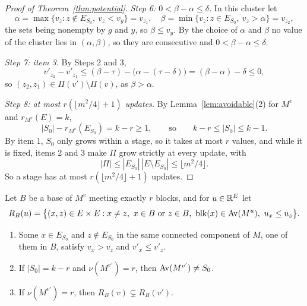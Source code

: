 \begin{proof}[Proof of Theorem~\ref{thm:potential}]
\emph{Step 6: $0<\beta-\alpha\le\delta$.}  In this cluster let
\[
  \alpha=\max\{v_z:z\notin E_{S_0},\ v_z<v_y\}=v_{z_1},\quad
  \beta=\min\{v_z:z\in E_{S_0},\ v_z>\alpha\}=v_{z_2},
\]
the sets being nonempty by $g$ and $y$, so $\beta\le v_y$.  By the choice of
$\alpha$ and $\beta$ no value of the cluster lies in $(\alpha,\beta)$, so they are
consecutive and $0<\beta-\alpha\le\delta$.

\emph{Step 7: item 3.}  By Steps 2 and 3,
\[
  v'_{z_2}-v'_{z_1}\le(\beta-\tau)-\bigl(\alpha-(\tau-\delta)\bigr)=(\beta-\alpha)-\delta\le0,
\]
so $(z_2,z_1)\in\Pi(v')\setminus\Pi(v)$, as $\beta>\alpha$.

\emph{Step 8: at most $r(\lfloor m^{2}/4\rfloor+1)$ updates.}  By Lemma~\ref{lem:avoidable}(2) for $M^{v}$ and
$r_{M^{v}}(E)=k$,
\[
  |S_0|-r_{M^{v}}(E_{S_0})=k-r\ge1,\qquad\text{so}\qquad k-r\le|S_0|\le k-1.
\]
By item 1, $S_0$ only grows within a stage, so it takes at most $r$ values, and
while it is fixed, items 2 and 3 make $\Pi$ grow strictly at every update, with
\[
  |\Pi|\le|E_{S_0}|\,|E\setminus E_{S_0}|\le\lfloor m^{2}/4\rfloor.
\]
So a stage has at most $r(\lfloor m^{2}/4\rfloor+1)$ updates.
\end{proof}

\begin{lemma}
\label{lem:crossing}
Let $B$ be a base of $M^{v}$ meeting exactly $r$ blocks, and for $u\in\mathbb R^{E}$ let
\[
  R_B(u)=\bigl\{(x,z)\in E\times E:x\ne z,\ x\in B\text{ or }z\in B,\
  \operatorname{blk}(x)\in\operatorname{Av}(M^{u}),\ u_x\le u_z\bigr\}.
\]
\begin{enumerate}
  \item Some $x\in E_{S_0}$ and $z\notin E_{S_0}$ in the same connected component of $M$,
        one of them in $B$, satisfy $v_x>v_z$ and $v'_x\le v'_z$.
  \item If $|S_0|=k-r$ and $\nu(M^{v'})=r$, then $\operatorname{Av}(M^{v'})\ne S_0$.
  \item If $\nu(M^{v'})=r$, then $R_B(v)\subsetneq R_B(v')$.
\end{enumerate}
\end{lemma}

